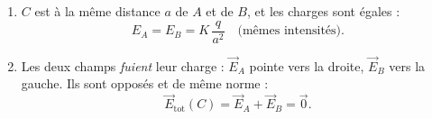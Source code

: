 \documentclass[11pt,a4paper]{article}
\newcommand{\vv}[1]{\vec{#1}}\newcommand{\ds}{\displaystyle}
\begin{document}
\begin{corrige}
\begin{enumerate}[label=\alph*)]
  \item $C$ est à la même distance $a$ de $A$ et de $B$, et les charges sont égales :
        \[ E_A = E_B = K\,\frac{q}{a^2}\quad\text{(mêmes intensités)}. \]
  \item Les deux champs \emph{fuient} leur charge : $\vv{E}_A$ pointe vers la droite, $\vv{E}_B$
        vers la gauche. Ils sont opposés et de même norme :
        \[ \vv{E}_{\text{tot}}(C) = \vv{E}_A + \vv{E}_B = \vv{0}. \]
\end{enumerate}
\end{corrige}
\end{document}

